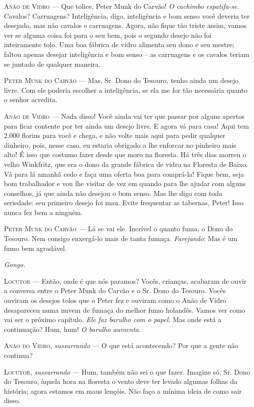 \begin{myparindent}{0pt}
\begin{Parskip}
\textsc{Anão de Vidro} --- Que tolice, Peter Munk do Carvão! \emph{O cachimbo
espatifa-se.} Cavalos? Carruagens? Inteligência, digo, inteligência e
bom senso você deveria ter desejado, mas não cavalos e carruagens.
Agora, não fique tão triste assim, vamos ver se alguma coisa foi para o
seu bem, pois o segundo desejo não foi inteiramente tolo. Uma boa
fábrica de vidro alimenta seu dono e seu mestre; faltou apenas desejar
inteligência e bom senso -- as carruagens e os cavalos teriam se juntado
de qualquer maneira.

\textsc{Peter Munk do Carvão} --- Mas, Sr. Dono do Tesouro, tenho ainda um desejo
livre. Com ele poderia escolher a inteligência, se ela me for tão
necessária quanto o senhor acredita.

\textsc{Anão de Vidro} --- Nada disso! Você ainda vai ter que passar por alguns
apertos para ficar contente por ter ainda um desejo livre. E agora vá
para casa! Aqui tem 2.000 florins para você e chega, e não volte mais
aqui para pedir qualquer dinheiro, pois, nesse caso, eu estaria obrigado
a lhe enforcar no pinheiro mais alto! É isso que costumo fazer desde que
moro na floresta. Há três dias morreu o velho Winkfritz, que era o dono
da grande fábrica de vidro na Floresta de Baixo. Vá para lá amanhã cedo
e faça uma oferta boa para comprá-la! Fique bem, seja bom trabalhador e
vou lhe visitar de vez em quando para lhe ajudar com alguns conselhos,
já que ainda não desejou o bom senso. Mas lhe digo com toda seriedade:
seu primeiro desejo foi mau. Evite frequentar as tabernas, Peter! Isso
nunca fez bem a ninguém.

\textsc{Peter Munk do Carvão} --- Lá se vai ele. Incrível o quanto fuma, o Dono do
Tesouro. Nem consigo enxergá-lo mais de tanta fumaça. \emph{Farejando}:
Mas é um fumo bem agradável.

\emph{Gongo.}

\textsc{Locutor} --- Então, onde é que nós paramos? Vocês, crianças, acabaram de
ouvir a conversa entre o Peter Munk do Carvão e o Sr. Dono do Tesouro.
Vocês ouviram os desejos tolos que o Peter fez e ouviram como o Anão de
Vidro desapareceu numa nuvem de fumaça do melhor fumo holandês. Vamos
ver como vai ser o próximo capítulo. \emph{Ele faz barulho com o papel.}
Mas onde está a continuação? Hum, hum! \emph{O barulho aumenta.}

\textsc{Anão do Vidro}, \emph{sussurrando} --- O que está acontecendo? Por que a
gente não continua?

\textsc{Locutor}, \emph{sussurrando} --- Hum, também não sei o que fazer. Imagine
só, Sr. Dono do Tesouro, àquela hora na floresta o vento deve ter levado
algumas folhas da história; agora estamos em maus lençóis. Não faço a
mínima ideia de como sair disso.


\end{Parskip}
\end{myparindent}
